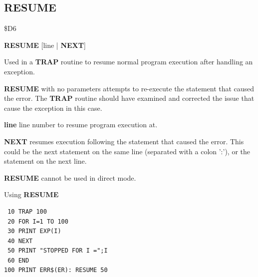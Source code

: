\subsection{RESUME}
\begin{description}[leftmargin=2cm,style=nextline]
\item [Token:] \$D6
\item [Format:] {\bf RESUME} [line | {\bf NEXT}]
\item [Usage:]  Used in a {\bf TRAP} routine to
                resume normal program execution after
                handling an exception.

                {\bf RESUME} with no parameters attempts to
                re-execute the statement that caused the error.
                The {\bf TRAP} routine should have examined
                and corrected the issue that cause the exception in this case.

                {\bf line} line number to resume program execution at.

                {\bf NEXT} resumes execution following the statement that caused
                the error. This could be the next statement on the same line
                (separated with a colon ':'), or the statement on the next line.

\item [Remarks:] {\bf RESUME} cannot be used in direct mode.
\item [Example:] Using {\bf RESUME}

\begin{tcolorbox}[colback=black,coltext=white]
\verbatimfont{\codefont}
\begin{verbatim}
 10 TRAP 100
 20 FOR I=1 TO 100
 30 PRINT EXP(I)
 40 NEXT
 50 PRINT "STOPPED FOR I =";I
 60 END
100 PRINT ERR$(ER): RESUME 50
\end{verbatim}
\end{tcolorbox}
\end{description}


\newpage
